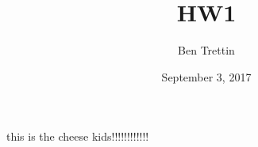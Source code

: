 \documentclass[12pt]{article}
\title{HW1}
\author{Ben Trettin}
\date{September 3, 2017}
\begin{document}
\maketitle
this is the cheese kids!!!!!!!!!!!!
\end{document}
